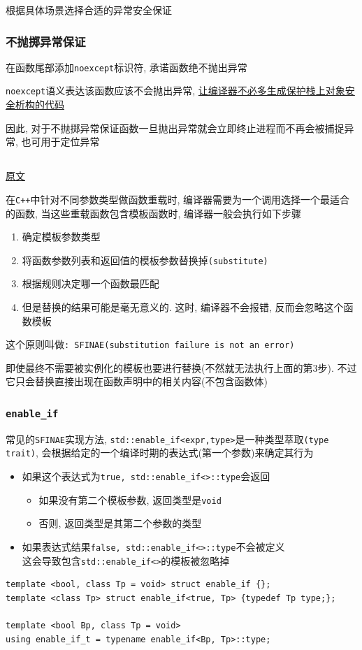 根据具体场景选择合适的异常安全保证
\subsubsection{不抛掷异常保证}
在函数尾部添加{\tt noexcept}标识符, 承诺函数绝不抛出异常

{\tt noexcept}语义表达该函数应该不会抛出异常, \uline{让编译器不必多生成保护栈上对象安全析构的代码}

因此, 对于不抛掷异常保证函数一旦抛出异常就会立即终止进程而不再会被捕捉异常, 也可用于定位异常
\subsection{\color{purple}{\tt SFINAE}}
\href{https://zhuanlan.zhihu.com/p/338822185}{原文}

在{\tt C++}中针对不同参数类型做函数重载时, 编译器需要为一个调用选择一个最适合的函数,
	当这些重载函数包含模板函数时, 编译器一般会执行如下步骤
\begin{enumerate}
	\item 确定模板参数类型
	\item 将函数参数列表和返回值的模板参数替换掉{\tt (substitute)}
	\item 根据规则决定哪一个函数最匹配
	\item 但是替换的结果可能是毫无意义的. 这时, 编译器不会报错, 反而会忽略这个函数模板
\end{enumerate}

这个原则叫做{\tt: SFINAE(substitution failure is not an error)}

即使最终不需要被实例化的模板也要进行替换(不然就无法执行上面的第3步). 
	不过它只会替换直接出现在函数声明中的相关内容(不包含函数体)

\subsubsection{\tt enable\_if}
常见的{\tt SFINAE}实现方法, {\tt std::enable\_if<expr,type>}是一种类型萃取{\tt(type trait)}, 
	会根据给定的一个编译时期的表达式(第一个参数)来确定其行为
\begin{itemize}
	\item 如果这个表达式为{\tt true, std::enable\_if<>::type}会返回
	\begin{itemize}
		\item 如果没有第二个模板参数, 返回类型是{\tt void}
		\item 否则, 返回类型是其第二个参数的类型
	\end{itemize}
	\item 如果表达式结果{\tt false, std::enable\_if<>::type}不会被定义
		\\这会导致包含{\tt std::enable\_if<>}的模板被忽略掉
\end{itemize}
\begin{lstlisting}
template <bool, class Tp = void> struct enable_if {};
template <class Tp> struct enable_if<true, Tp> {typedef Tp type;};

template <bool Bp, class Tp = void> 
using enable_if_t = typename enable_if<Bp, Tp>::type;
\end{lstlisting}

